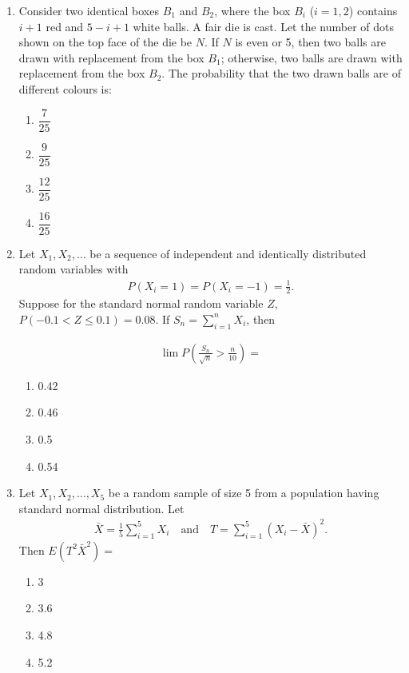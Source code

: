 \documentclass[journal]{IEEEtran}
\numberwithin{equation}{enumi}
\numberwithin{figure}{enumi}
\begin{document}
\begin{enumerate}
\item Consider two identical boxes $B_1$ and $B_2$, where the box $B_i$ ($i=1,2$) contains $i+1$ red and $5 - i + 1$ white balls. A fair die is cast. Let the number of dots shown on the top face of the die be $N$. If $N$ is even or 5, then two balls are drawn with replacement from the box $B_1$; otherwise, two balls are drawn with replacement from the box $B_2$. The probability that the two drawn balls are of different colours is: \hfill{}
\begin{multicols}{4}
\begin{enumerate}
    \item $\dfrac{7}{25}$
    \item  $\dfrac{9}{25}$
    \item $\dfrac{12}{25}$ 
    \item  $\dfrac{16}{25}$    
\end{enumerate}
\end{multicols}
        


\item Let $X_1, X_2, \ldots$ be a sequence of independent and identically distributed random variables with    
\begin{align*}
P(X_i = 1) = P(X_i = -1) = \frac{1}{2}.
\end{align*}
Suppose for the standard normal random variable $Z$, $P(-0.1 < Z \leq 0.1) = 0.08$. If $S_n = \sum_{i=1}^{n} X_i$, then

\begin{align*}
\lim P\left(\frac{S_n}{\sqrt{n}} > \frac{n}{10}\right) =
\end{align*}
\begin{multicols}{4}
\begin{enumerate}
    \item 0.42
    \item 0.46
    \item 0.5
    \item 0.54  
\end{enumerate}
\end{multicols}



\item  Let $X_1, X_2, \ldots, X_5$ be a random sample of size 5 from a population having standard normal distribution. Let 
\begin{align*}
\bar{X} = \frac{1}{5} \sum_{i=1}^{5} X_i \quad \text{and} \quad T = \sum_{i=1}^{5} (X_i - \bar{X})^2.
\end{align*}
Then $E(T^2 \bar{X}^2) =$ \hfill{}
\begin{multicols}{4}
\begin{enumerate}
    \item 3
    \item 3.6
    \item 4.8
    \item 5.2
\end{enumerate}
\end{multicols}




\end{enumerate}
\end{document}
